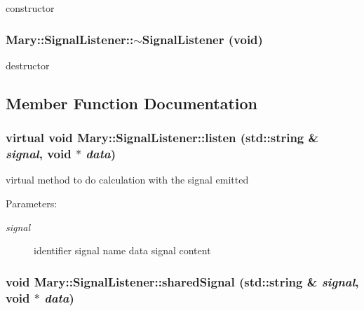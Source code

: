 constructor \hypertarget{class_mary_1_1_signal_listener_16e4a866d0d8a152affb6f0bc77e78ec}{
\subsubsection[$\sim$SignalListener]{\setlength{\rightskip}{0pt plus 5cm}Mary::SignalListener::$\sim$SignalListener (void)}}
\label{class_mary_1_1_signal_listener_16e4a866d0d8a152affb6f0bc77e78ec}


destructor 

\subsection{Member Function Documentation}
\hypertarget{class_mary_1_1_signal_listener_48f677603d7a04727da9bd374cb4b6ff}{
\subsubsection[listen]{\setlength{\rightskip}{0pt plus 5cm}virtual void Mary::SignalListener::listen (std::string \& {\em signal}, \/  void $\ast$ {\em data})}}
\label{class_mary_1_1_signal_listener_48f677603d7a04727da9bd374cb4b6ff}


virtual method to do calculation with the signal emitted \begin{Desc}
\item[Parameters:]
\begin{description}
\item[{\em signal}]identifier signal name  data signal content \end{description}
\end{Desc}
\hypertarget{class_mary_1_1_signal_listener_68b733fa309d62ada6eb9e3a28ae2dea}{
\subsubsection[sharedSignal]{\setlength{\rightskip}{0pt plus 5cm}void Mary::SignalListener::sharedSignal (std::string \& {\em signal}, \/  void $\ast$ {\em data})}}
\label{class_mary_1_1_signal_listener_68b733fa309d62ada6eb9e3a28ae2dea}


